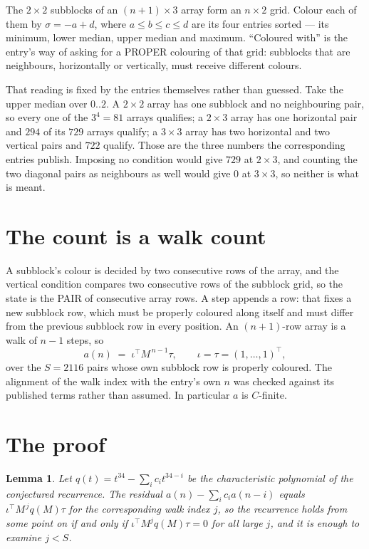 \documentclass[11pt,a4paper]{article}
\theoremstyle{plain}
\newtheorem{lemma}[theorem]{Lemma}
\theoremstyle{definition}
\begin{document}
The $2\times2$ subblocks of an $(n+1)\times3$ array form an
$n\times2$ grid. Colour each of them by $\sigma=-a+d$, where $a\le b\le c\le d$ are its four entries sorted --- its minimum, lower median, upper median and maximum. ``Coloured with'' is the entry's way of
asking for a PROPER colouring of that grid: subblocks that are neighbours, horizontally or
vertically, must receive different colours.

That reading is fixed by the entries themselves rather than guessed. Take the upper median
over $0..2$. A $2\times2$ array has one subblock and no neighbouring pair, so every one of the
$3^4=81$ arrays qualifies; a $2\times3$ array has one horizontal pair and $294$ of its $729$
arrays qualify; a $3\times3$ array has two horizontal and two vertical pairs and $722$
qualify. Those are the three numbers the corresponding entries publish. Imposing no condition
would give $729$ at $2\times3$, and counting the two diagonal pairs as neighbours as well
would give $0$ at $3\times3$, so neither is what is meant.

\section{The count is a walk count}

A subblock's colour is decided by two consecutive rows of the array, and
the vertical condition compares two consecutive rows of the subblock grid, so the state is the
PAIR of consecutive array rows. A step appends a row: that fixes a new subblock row, which
must be properly coloured along itself and must differ from the previous subblock row in every
position. An $(n+1)$-row array is a walk of $n-1$ steps, so
\[
a(n)\;=\;\iota^{\!\top}M^{\,n-1}\tau,\qquad\iota=\tau=(1,\dots,1)^{\!\top},
\]
over the $S=2116$ pairs whose own subblock row is properly coloured.
The alignment of the walk index with the entry's own $n$ was checked against its published
terms rather than assumed. In particular $a$ is $C$-finite.

\section{The proof}

\begin{lemma}\label{lem:crit}
Let $q(t)=t^{34}-\sum_i c_it^{34-i}$ be the characteristic polynomial of the
conjectured recurrence. The residual $a(n)-\sum_ic_ia(n-i)$ equals
$\iota^{\!\top}M^{\,j}q(M)\tau$ for the corresponding walk index $j$, so the recurrence
holds from some point on if and only if $\iota^{\!\top}M^{j}q(M)\tau=0$ for all large $j$,
and it is enough to examine $j<S$.
\end{lemma}
\end{document}
